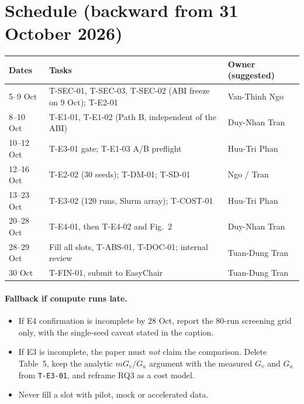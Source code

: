 \documentclass[10pt,a4paper]{article}
\begin{document}
\section{Schedule (backward from 31 October 2026)}
\begin{center}
\small
\begin{tabularx}{\linewidth}{@{}lXl@{}}
\toprule
Dates & Tasks & Owner (suggested) \\
\midrule
5--9 Oct & T-SEC-01, T-SEC-03, T-SEC-02 (ABI freeze on 9 Oct); T-E2-01 & Van-Thinh Ngo \\
8--10 Oct & T-E1-01, T-E1-02 (Path B, independent of the ABI) & Duy-Nhan Tran \\
10--12 Oct & T-E3-01 gate; T-E1-03 A/B preflight & Huu-Tri Phan \\
12--16 Oct & T-E2-02 (30 seeds); T-DM-01; T-SD-01 & Ngo / Tran \\
13--23 Oct & T-E3-02 (120 runs, Slurm array); T-COST-01 & Huu-Tri Phan \\
20--28 Oct & T-E4-01, then T-E4-02 and Fig.~2 & Duy-Nhan Tran \\
28--29 Oct & Fill all slots, T-ABS-01, T-DOC-01; internal review & Tuan-Dung Tran \\
30 Oct & T-FIN-01, submit to EasyChair & Tuan-Dung Tran \\
\bottomrule
\end{tabularx}
\end{center}

\paragraph{Fallback if compute runs late.}
\begin{itemize}
\item If E4 confirmation is incomplete by 28 Oct, report the 80-run screening grid only, with the single-seed caveat stated in the caption.
\item If E3 is incomplete, the paper must \emph{not} claim the comparison. Delete Table~5, keep the analytic $mG_v/G_a$ argument with the measured $G_v$ and $G_a$ from \texttt{T-E3-01}, and reframe RQ3 as a cost model.
\item Never fill a slot with pilot, mock or accelerated data.
\end{itemize}
\end{document}
